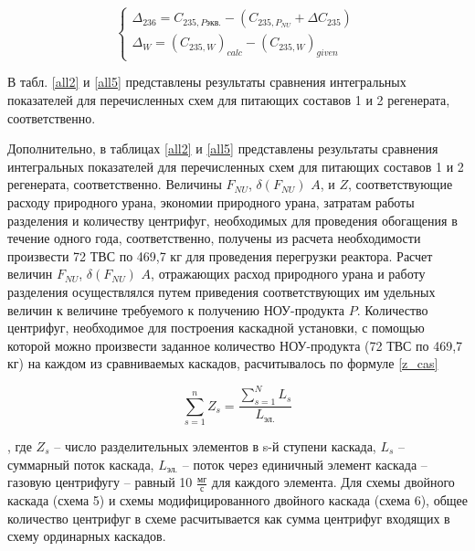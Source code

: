 \begin{equation}\label{snau_sch1}
  \begin{cases}
  \Delta_{236}=C_{235,P\textit{экв.}}-(C_{235,{P_{NU}}}+\Delta C_{235})\\
  \Delta_{W} = {(C_{235, W})}_{calc}-{(C_{235, W})}_{given}
  \end{cases}\,
\end{equation}

В табл. \ref{all2} и \ref{all5} представлены результаты сравнения интегральных показателей для перечисленных схем для питающих составов 1 и 2 регенерата, соответственно.

Дополнительно, в таблицах \ref{all2} и \ref{all5} представлены результаты сравнения интегральных показателей для перечисленных схем для питающих составов 1 и 2 регенерата, соответственно.
Величины $F_{NU}$, $\delta(F_{NU})$ $A$, и $Z$, соответствующие расходу природного урана, экономии природного урана, затратам работы разделения и количеству центрифуг, необходимых для проведения обогащения в течение одного года, соответственно, получены из расчета необходимости произвести 72 ТВС по 469,7 кг для проведения перегрузки реактора. Расчет величин $F_{NU}$, $\delta(F_{NU})$ $A$, отражающих расход природного урана и работу разделения осуществлялся путем приведения соответствующих им удельных величин к величине требуемого к получению НОУ-продукта $P$. Количество центрифуг, необходимое для построения каскадной установки, с помощью которой можно произвести заданное количество НОУ-продукта (72 ТВС по 469,7 кг) на каждом из сравниваемых каскадов, расчитывалось по формуле \ref{z_cas}

\begin{equation}\label{z_cas}
\sum_{s=1}^n Z_s=\frac{\sum_{s=1}^N L_s}{L_{\textit{эл.}}}
\end{equation}

, где $Z_s$ – число разделительных элементов в s-й ступени каскада, $L_s$ -- суммарный поток каскада, $L_{\textit{эл.}}$ -- поток через единичный элемент каскада -- газовую центрифугу -- равный 10 $\frac{\textit{мг}}{\textit{с}}$ для каждого элемента. Для схемы двойного каскада (схема 5) и схемы модифицированного двойного каскада (схема 6), общее количество центрифуг в схеме расчитывается как сумма центрифуг входящих в схему ординарных каскадов.

